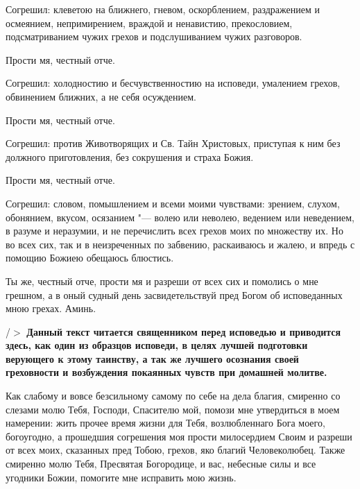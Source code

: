 Согрешил: клеветою на ближнего, гневом, оскорблением, раздражением и осмеянием, непримирением, враждой и ненавистию, прекословием, подсматриванием чужих грехов и подслушиванием чужих разговоров. 



Прости мя, честный отче. 



Согрешил: холодностию и бесчувственностию на исповеди, умалением грехов, обвинением ближних, а не себя осуждением. 



Прости мя, честный отче. 



Согрешил: против Животворящих и Св. Тайн Христовых, приступая к ним без должного приготовления, без сокрушения и страха Божия. 



Прости мя, честный отче. 



Согрешил: словом, помышлением и всеми моими чувствами: зрением, слухом, обонянием, вкусом, осязанием "--- волею или неволею, ведением или неведением, в разуме и неразумии, и не перечислить всех грехов моих по множеству их. Но во всех сих, так и в неизреченных по забвению, раскаиваюсь и жалею, и впредь с помощию Божиею обещаюсь блюстись. 



Ты же, честный отче, прости мя и разреши от всех сих и помолись о мне грешном, а в оный судный день засвидетельствуй пред Богом об исповеданных мною грехах. Аминь. 

/$>$\bfseries *\normalfont{} Данный текст читается священником перед исповедью и приводится здесь, как один из образцов исповеди, в целях лучшей подготовки верующего к этому таинству, а так же лучшего осознания своей греховности и возбуждения покаянных чувств при домашней молитве. 

 

 

 

 



\mychapterending

 


Как слабому и вовсе безсильному самому по себе на дела благия, смиренно со слезами молю Тебя, Господи, Спасителю мой, помози мне утвердиться в моем намерении: жить прочее время жизни для Тебя, возлюбленнаго Бога моего, богоугодно, а прошедшия согрешения моя прости милосердием Своим и разреши от всех моих, сказанных пред Тобою, грехов, яко благий Человеколюбец. Также смиренно молю Тебя, Пресвятая Богородице, и вас, небесные силы и все угодники Божии, помогите мне исправить мою жизнь.\itshape  

